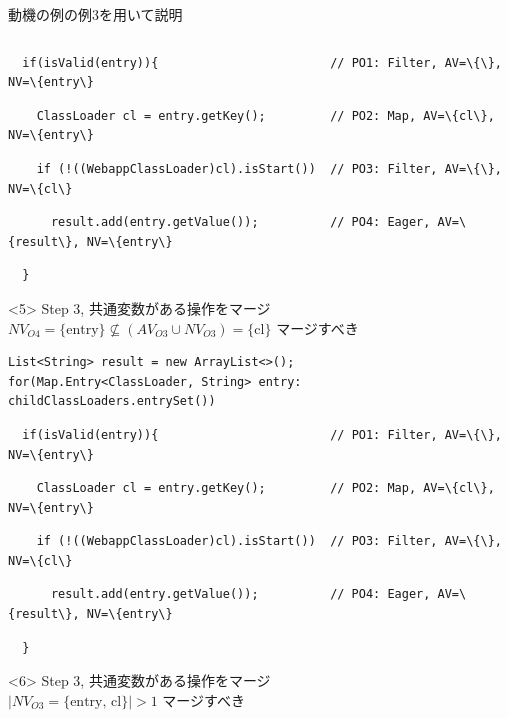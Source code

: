 \begin{frame}[fragile]{動機の例の例3を用いて説明}
\begin{onlyenv}
\begin{lstlisting}
\end{lstlisting}
\begin{lstlisting}
  if(isValid(entry)){                        // PO1: Filter, AV=\{\}, NV=\{entry\}
\end{lstlisting}
\begin{lstlisting}
    ClassLoader cl = entry.getKey();         // PO2: Map, AV=\{cl\}, NV=\{entry\}
\end{lstlisting}
\begin{lstlisting}
    if (!((WebappClassLoader)cl).isStart())  // PO3: Filter, AV=\{\}, NV=\{cl\}
\end{lstlisting}
\begin{lstlisting}
      result.add(entry.getValue());          // PO4: Eager, AV=\{result\}, NV=\{entry\}
\end{lstlisting}
\begin{lstlisting}
  }
\end{lstlisting}
\end{onlyenv}
\begin{onlyenv}<5>
Step 3, 共通変数がある操作をマージ\\
$NV_{O4} = \{\text{entry}\} \nsubseteq (AV_{O3} \cup NV_{O3}) = \{\text{cl}\}$ マージすべき
\begin{lstlisting}
List<String> result = new ArrayList<>();
for(Map.Entry<ClassLoader, String> entry: childClassLoaders.entrySet())
\end{lstlisting}
\begin{lstlisting}
  if(isValid(entry)){                        // PO1: Filter, AV=\{\}, NV=\{entry\}
\end{lstlisting}
\begin{lstlisting}
    ClassLoader cl = entry.getKey();         // PO2: Map, AV=\{cl\}, NV=\{entry\}
\end{lstlisting}
\begin{lstlisting}
    if (!((WebappClassLoader)cl).isStart())  // PO3: Filter, AV=\{\}, NV=\{cl\}
\end{lstlisting}
\begin{lstlisting}
      result.add(entry.getValue());          // PO4: Eager, AV=\{result\}, NV=\{entry\}
\end{lstlisting}
\begin{lstlisting}
  }
\end{lstlisting}
\end{onlyenv}
\begin{onlyenv}<6>
Step 3, 共通変数がある操作をマージ\\
$| NV_{O3} = \{\text{entry, cl}\}| > 1$ マージすべき

\end{onlyenv}
\end{frame}
